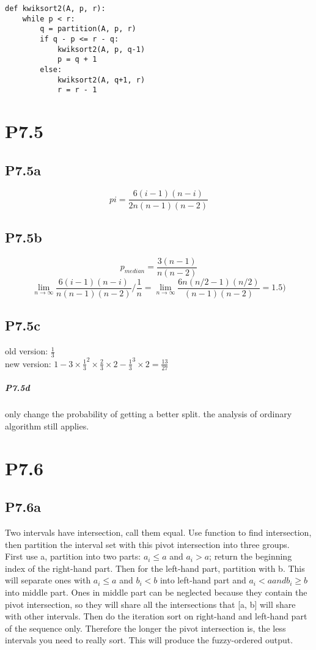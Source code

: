 \documentclass{article}
\begin{document}
\begin{verbatim}
def kwiksort2(A, p, r):
	while p < r:
		q = partition(A, p, r)
		if q - p <= r - q:
			kwiksort2(A, p, q-1)
			p = q + 1
		else:
			kwiksort2(A, q+1, r)
			r = r - 1
\end{verbatim}			
\section*{P7.5}
\subsection*{P7.5a}
$$pi=\frac{6(i-1)(n-i)}{2n(n-1)(n-2)}$$
\subsection*{P7.5b}
$$p_{median} = \frac{3(n-1)}{n(n-2)}$$
$$\lim_{n \to \infty}\frac{6(i-1)(n-i)}{n(n-1)(n-2)}/\frac{1}{n} = \lim_{n \to \infty}\frac{6n(n/2 - 1)(n/2)}{(n-1)(n-2)} = 1.5 )$$	
\subsection*{P7.5c}
old version: $\frac{1}{3}$\\
new version: $1-3\times\frac{1}{3}^2\times\frac{2}{3}\times2-\frac{1}{3}^3\times2 = \frac{13}{27}$
\subparagraph*{P7.5d}
only change the probability of getting a better split. the analysis of ordinary algorithm still applies.
\section*{P7.6}
\subsection*{P7.6a}
Two intervals have intersection, call them equal. Use function to find intersection, then partition the interval set with this pivot intersection into three groups.\\ First use a, partition into two parts: $a_i \leq a$ and $a_i > a$; return the beginning index of the right-hand part. Then for the left-hand part, partition with b. This will separate ones with $a_i \leq a$ and $b_i < b$ into left-hand part and $a_i < a and b_i \geq b$ into middle part. Ones in middle part can be neglected because they contain the pivot intersection, so they will share all the intersections that [a, b] will share with other intervals. Then do the iteration sort on right-hand and left-hand part of the sequence only. Therefore the longer the pivot intersection is, the less intervals you need to really sort. This will produce the fuzzy-ordered output.
\inputminted[linenos, tabsize=4,frame=lines,baselinestretch=1.2,fontsize=\footnotesize]{python}{Fuzzy_interval_sort.py}
\end{document}
